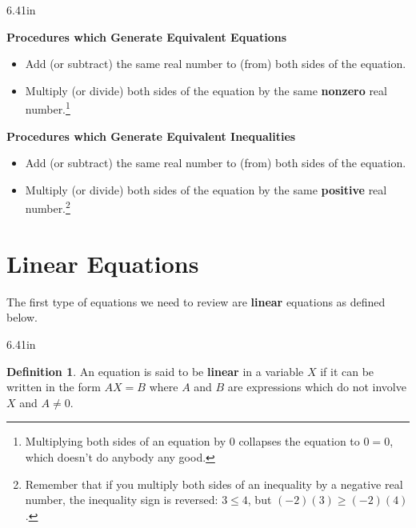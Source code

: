\documentclass[11pt]{article}
\theoremstyle{definition}  %
\newtheorem{defn}{\bf Definition}[section]
\newcommand{\bbm}{\begin{boxedminipage}{6.41in}}
\newcommand{\ebm}{\end{boxedminipage}}
\begin{document}
\colorbox{ResultColor}{\bbm

\centerline{\textbf{Procedures which Generate Equivalent Equations}}

\begin{itemize}

\item  Add (or subtract) the same real number to (from) both sides of the equation.

\item  Multiply (or divide) both sides of the equation by the same \textbf{nonzero} real number.\footnote{Multiplying both sides of an equation by $0$ collapses the equation to $0 = 0$, which doesn't do anybody any good.}

\end{itemize}

\centerline{\textbf{Procedures which Generate Equivalent Inequalities}}

\vspace{-0.1in}

\begin{itemize}

\item  Add (or subtract) the same real number to (from) both sides of the equation.

\item  Multiply (or divide) both sides of the equation by the same \textbf{positive} real number.\footnote{Remember that if you multiply both sides of an inequality by a negative real number, the inequality sign is reversed:  $3 \leq 4$, but $(-2)(3) \geq (-2)(4)$.}

\end{itemize}

\ebm}

\section{Linear Equations} \label{LinearEqn}

The first type of equations we need to review are \textbf{linear} equations as defined below.

\medskip

\colorbox{ResultColor}{\bbm

\begin{defn}\label{lineareqndefn} An equation is said to be \textbf{linear} in a variable $X$ if it can be written in the form $AX = B$ where $A$ and $B$ are expressions which do not involve $X$ and $A \neq 0$.

\end{defn}

\ebm}
\end{document}
